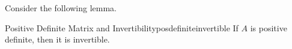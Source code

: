 
Consider the following lemma.

\begin{lemma}{Positive Definite Matrix and Invertibility}{posdefiniteinvertible}
If $A$ is positive definite, then it is invertible.
\end{lemma}


